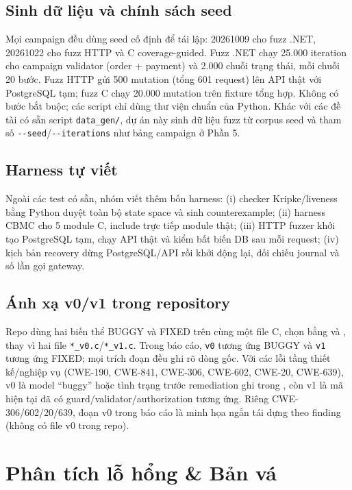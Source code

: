 \documentclass[12pt,a4paper]{article}
\newcommand{\cmd}[1]{\texttt{\detokenize{#1}}}
\begin{document}
\subsection{Sinh dữ liệu và chính sách seed}
Mọi campaign đều dùng seed cố định để tái lập: 20261009 cho fuzz .NET,
20261022 cho fuzz HTTP và C coverage-guided. Fuzz .NET chạy 25.000
iteration cho campaign validator (order + payment) và 2.000 chuỗi trạng thái,
mỗi chuỗi 20 bước. Fuzz HTTP
gửi 500 mutation (tổng 601 request) lên API thật với PostgreSQL tạm; fuzz C chạy
20.000 mutation trên fixture tổng hợp. Không có bước \cmd{pip install} bắt buộc;
các script chỉ dùng thư viện chuẩn của Python. Khác với các đề tài có sẵn script
\texttt{data\_gen/}, dự án này sinh dữ liệu fuzz từ corpus seed và tham số
\texttt{-{}-seed}/\texttt{-{}-iterations} như bảng campaign ở Phần 5.

\subsection{Harness tự viết}
Ngoài các test có sẵn, nhóm viết thêm bốn harness: (i) checker Kripke/liveness bằng
Python duyệt toàn bộ state space và sinh counterexample; (ii) harness CBMC cho 5
module C, include trực tiếp module thật; (iii) HTTP fuzzer khởi tạo PostgreSQL tạm,
chạy API thật và kiểm bất biến DB sau mỗi request; (iv) kịch bản recovery dừng
PostgreSQL/API rồi khởi động lại, đối chiếu journal và số lần gọi gateway.

\subsection{Ánh xạ v0/v1 trong repository}
Repo dùng hai biến thể BUGGY và FIXED trên cùng một file C, chọn
bằng \cmd{-UFIXED} và \cmd{-DFIXED}, thay vì hai file \texttt{*\_v0.c}/\texttt{*\_v1.c}.
Trong báo cáo, \texttt{v0} tương ứng BUGGY và \texttt{v1} tương ứng FIXED; mọi
trích đoạn đều ghi rõ dòng gốc. Với các lỗi tầng thiết kế/nghiệp vụ
(CWE-190, CWE-841, CWE-306, CWE-602, CWE-20, CWE-639), v0 là model ``buggy'' hoặc
tình trạng trước remediation ghi trong ,
còn v1 là mã hiện tại đã có guard/validator/authorization tương ứng. Riêng
CWE-306/602/20/639, đoạn v0 trong báo cáo là minh họa ngắn tái dựng theo finding
(không có file v0 trong repo).

\section{Phân tích lỗ hổng \& Bản vá}
\end{document}
